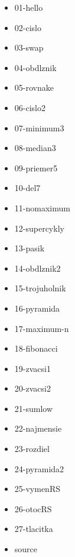 



\begin{itemize}
\item 01-hello
\item 02-cislo
\item 03-swap
\item 04-obdlznik
\item 05-rovnake
\item 06-cislo2
\item 07-minimum3
\item 08-median3
\item 09-priemer5
\item 10-del7
\item 11-nomaximum
\item 12-supercykly
\item 13-pasik
\item 14-obdlznik2
\item 15-trojuholnik
\item 16-pyramida
\item 17-maximum-n
\item 18-fibonacci
\item 19-zvacsi1
\item 20-zvacsi2
\item 21-sumlow
\item 22-najmensie
\item 23-rozdiel
\item 24-pyramida2
\item 25-vymenRS
\item 26-otocRS
\item 27-tlacitka
\item source
\end{itemize}


